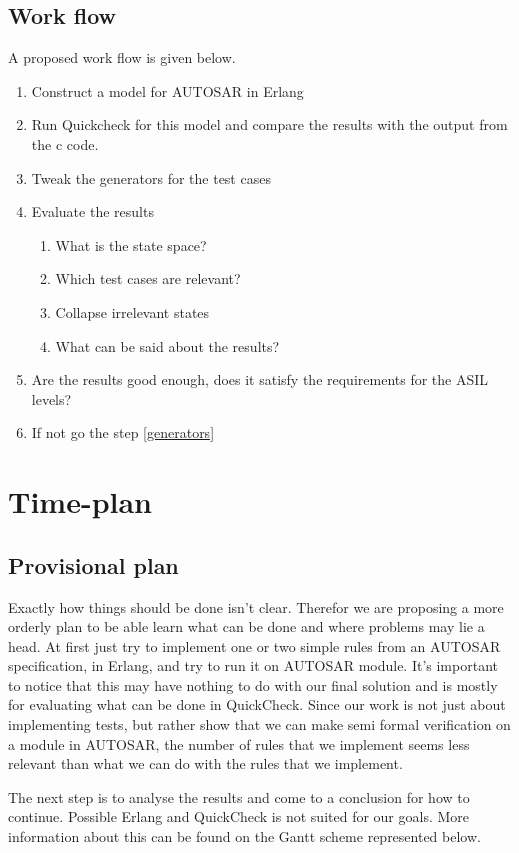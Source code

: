 \documentclass[11pt,a4paper]{report}
\begin{document}
\section{Work flow}
A proposed work flow is given below.

\begin{enumerate}
\item Construct a model for AUTOSAR in Erlang
\item Run Quickcheck for this model and compare the results with the output from
the c code.
\item Tweak the generators for the test cases \label{generators}
    \item Evaluate the results
    \begin{enumerate}
      \item What is the state space?
      \item Which test cases are relevant?
      \item Collapse irrelevant states
      \item What can be said about the results?
    \end{enumerate}
\item Are the results good enough, does it satisfy the requirements for the ASIL
levels?
\item If not go the step \ref{generators}
\end{enumerate}


\chapter{Time-plan}
\section{Provisional plan}
Exactly how things should be done isn't clear. Therefor we are proposing a more
orderly plan to be able learn what can be done and where problems may lie a
head. At first just try to implement one or two simple rules from an AUTOSAR
specification, in Erlang, and try to run it on AUTOSAR module. It's important to
notice that this may have nothing to do with our final solution and is mostly
for evaluating what can be done in QuickCheck. Since our work is not just about
implementing tests, but rather show that we can make semi formal verification on
a module in AUTOSAR, the number of rules that we implement seems less relevant
than what we can do with the rules that we implement.

The next step is to analyse the results and come to a conclusion for how to
continue. Possible Erlang and QuickCheck is not suited for our goals.
More information about this can be found on the Gantt scheme
represented below.
\end{document}
